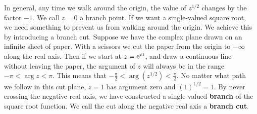 \begin{Example}
  In general, any time we walk around the origin, the value of $z^{1/2}$
  changes by the factor $-1$.  We call $z = 0$ a branch point.  
  If we want a single-valued square root, we need something to prevent us from
  walking around the origin.  We achieve this by introducing a
  branch cut.  Suppose we have the complex plane drawn on an infinite sheet
  of paper. With a scissors we cut the paper from the origin
  to $-\infty$ along the real axis.  Then if we start at $z = \mathop{\mathrm{e}}\nolimits^{\imath 0}$,
  and draw a continuous line without leaving the paper, the argument of
  $z$ will always be in the range $-\pi < \arg z < \pi$.  This means
  that $-\frac{\pi}{2} < \arg \left( z^{1/2} \right) < \frac{\pi}{2}$.  No matter what
  path we follow in this cut plane, $z = 1$ has argument zero and
  $(1)^{1/2} = 1$.  By never crossing the negative real axis, we have
  constructed a single valued \textbf{branch} of the square root function.
  We call the cut along the negative real axis a \textbf{branch cut}.
\end{Example}






